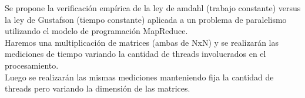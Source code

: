 Se propone la verificación empírica de la ley de amdahl  (trabajo constante)
versus la ley de  Gustafson (tiempo constante) aplicada a un problema de
paralelismo utilizando el modelo de programación MapReduce.\\
Haremos una multiplicación de matrices (ambas de NxN) y se realizarán las
mediciones de tiempo variando la cantidad de threads involucrados en el
procesamiento.\\
Luego se realizarán las mismas mediciones manteniendo fija la cantidad de
threads pero variando la dimensión de las matrices.
